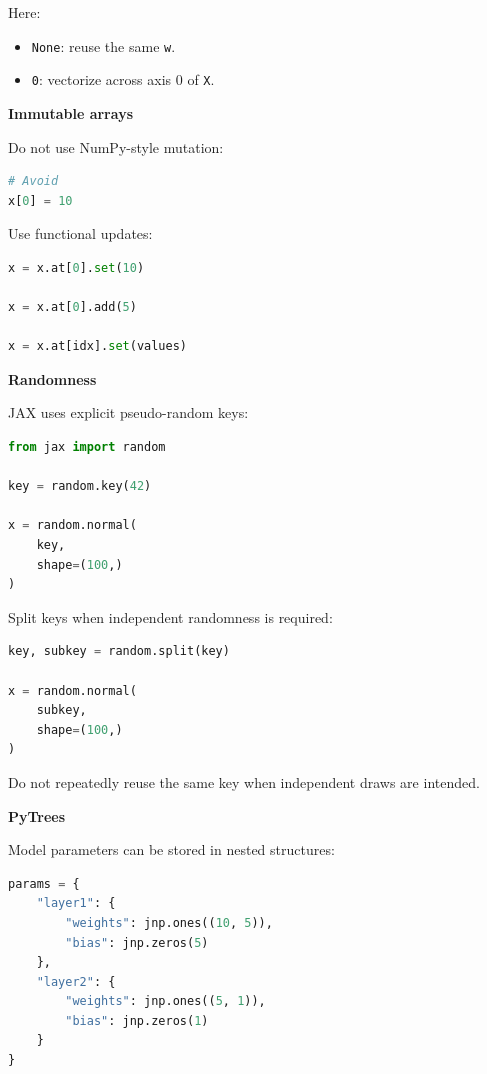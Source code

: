 \documentclass[11pt,letterpaper]{article}
\begin{document}
Here:

\begin{itemize}[leftmargin=*]
    \item \texttt{None}: reuse the same \texttt{w}.
    \item \texttt{0}: vectorize across axis 0 of \texttt{X}.
\end{itemize}

\textbf{Immutable arrays}

Do not use NumPy-style mutation:

\begin{lstlisting}[language=Python]
# Avoid
x[0] = 10
\end{lstlisting}

Use functional updates:

\begin{lstlisting}[language=Python]
x = x.at[0].set(10)

x = x.at[0].add(5)

x = x.at[idx].set(values)
\end{lstlisting}

\textbf{Randomness}

JAX uses explicit pseudo-random keys:

\begin{lstlisting}[language=Python]
from jax import random

key = random.key(42)

x = random.normal(
    key,
    shape=(100,)
)
\end{lstlisting}

Split keys when independent randomness is required:

\begin{lstlisting}[language=Python]
key, subkey = random.split(key)

x = random.normal(
    subkey,
    shape=(100,)
)
\end{lstlisting}

Do not repeatedly reuse the same key when independent draws are intended.

\textbf{PyTrees}

Model parameters can be stored in nested structures:

\begin{lstlisting}[language=Python]
params = {
    "layer1": {
        "weights": jnp.ones((10, 5)),
        "bias": jnp.zeros(5)
    },
    "layer2": {
        "weights": jnp.ones((5, 1)),
        "bias": jnp.zeros(1)
    }
}
\end{lstlisting}
\end{document}
